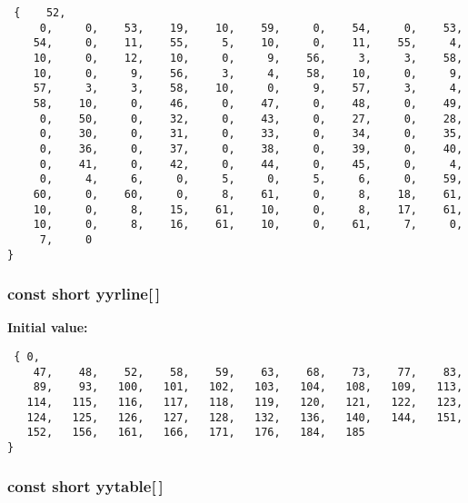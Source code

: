 \footnotesize\begin{verbatim} {    52,
     0,     0,    53,    19,    10,    59,     0,    54,     0,    53,
    54,     0,    11,    55,     5,    10,     0,    11,    55,     4,
    10,     0,    12,    10,     0,     9,    56,     3,     3,    58,
    10,     0,     9,    56,     3,     4,    58,    10,     0,     9,
    57,     3,     3,    58,    10,     0,     9,    57,     3,     4,
    58,    10,     0,    46,     0,    47,     0,    48,     0,    49,
     0,    50,     0,    32,     0,    43,     0,    27,     0,    28,
     0,    30,     0,    31,     0,    33,     0,    34,     0,    35,
     0,    36,     0,    37,     0,    38,     0,    39,     0,    40,
     0,    41,     0,    42,     0,    44,     0,    45,     0,     4,
     0,     4,     6,     0,     5,     0,     5,     6,     0,    59,
    60,     0,    60,     0,     8,    61,     0,     8,    18,    61,
    10,     0,     8,    15,    61,    10,     0,     8,    17,    61,
    10,     0,     8,    16,    61,    10,     0,    61,     7,     0,
     7,     0
}\end{verbatim}\normalsize 
{}
\subsubsection{\setlength{\rightskip}{0pt plus 5cm}const short yyrline[$\,$]\hspace{0.3cm}{\tt  [static]}}\label{vcd__parser_8c_a87}


{\bf Initial value:}

\footnotesize\begin{verbatim} { 0,
    47,    48,    52,    58,    59,    63,    68,    73,    77,    83,
    89,    93,   100,   101,   102,   103,   104,   108,   109,   113,
   114,   115,   116,   117,   118,   119,   120,   121,   122,   123,
   124,   125,   126,   127,   128,   132,   136,   140,   144,   151,
   152,   156,   161,   166,   171,   176,   184,   185
}\end{verbatim}\normalsize 
{}
\subsubsection{\setlength{\rightskip}{0pt plus 5cm}const short yytable[$\,$]\hspace{0.3cm}{\tt  [static]}}\label{vcd__parser_8c_a95}


